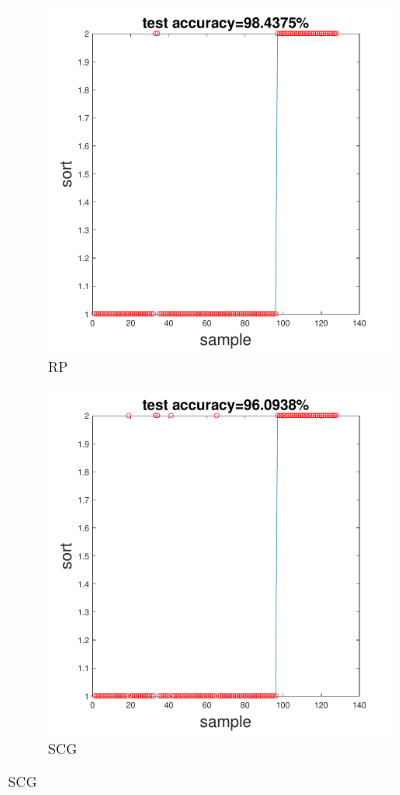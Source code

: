 \documentclass[12pt,a4paper]{article}
\begin{document}
\begin{CJK}{UTF8}{bsmi}
\begin{enumerate}
\begin{enumerate}
	 	\begin{figure}[H]
	 		\centering
	 		\begin{subfigure}{.5\textwidth}
	 			\centering
	 			\includegraphics[width=1.05\linewidth]{breast_rp}
	 			\caption{RP}
	 			
	 		\end{subfigure}%
	 		\begin{subfigure}{.5\textwidth}
	 			\centering
	 			\includegraphics[width=1.05\linewidth]{breast_scg}
	 			\caption{SCG}
	 			

\end{subfigure}
\end{figure}
\end{enumerate}
\end{enumerate}
\end{CJK}
\end{document}
